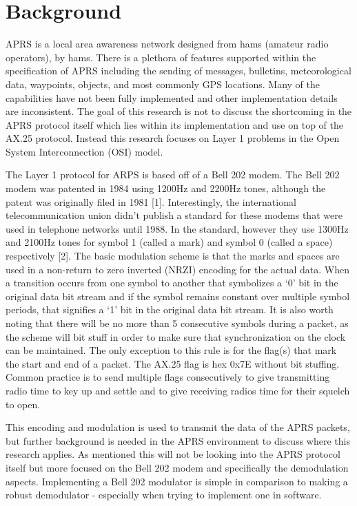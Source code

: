 \chapter{Background}

APRS is a local area awareness network designed from hams (amateur radio operators), by hams. There is a plethora of features supported within the specification of APRS including the sending of messages, bulletins, meteorological data, waypoints, objects, and most commonly GPS locations. Many of the capabilities have not been fully implemented and other implementation details are inconsistent. The goal of this research is not to discuss the shortcoming in the APRS protocol itself which lies within its implementation and use on top of the AX.25 protocol. Instead this research focuses on Layer 1 problems in the Open System Interconnection (OSI) model.

The Layer 1 protocol for ARPS is based off of a Bell 202 modem. The Bell 202 modem was patented in 1984 using 1200Hz and 2200Hz tones, although the patent was originally filed in 1981 [1]. Interestingly, the international telecommunication union didn’t publish a standard for these modems that were used in telephone networks until 1988. In the standard, however they use 1300Hz and 2100Hz tones for symbol 1 (called a mark) and symbol 0 (called a space) respectively [2]. The basic modulation scheme is that the marks and spaces are used in a non-return to zero inverted (NRZI) encoding for the actual data. When a transition occurs from one symbol to another that symbolizes a ‘0’ bit in the original data bit stream and if the symbol remains constant over multiple symbol periods, that signifies a ‘1’ bit in the original data bit stream. It is also worth noting that there will be no more than 5 consecutive symbols during a packet, as the scheme will bit stuff in order to make sure that synchronization on the clock can be maintained. The only exception to this rule is for the flag(s) that mark the start and end of a packet. The AX.25 flag is hex 0x7E without bit stuffing. Common practice is to send multiple flags consecutively to give transmitting radio time to key up and settle and to give receiving radios time for their squelch to open.

This encoding and modulation is used to transmit the data of the APRS packets, but further background is needed in the APRS environment to discuss where this research applies. As mentioned this will not be looking into the APRS protocol itself but more focused on the Bell 202 modem and specifically the demodulation aspects. Implementing a Bell 202 modulator is simple in comparison to making a robust demodulator - especially when trying to implement one in software.

